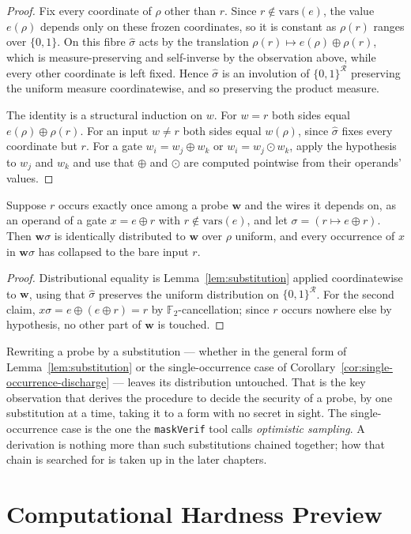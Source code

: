 \begin{proof}
Fix every coordinate of $\rho$ other than $r$. Since $r \notin \mathrm{vars}(e)$,
the value $e(\rho)$ depends only on these frozen coordinates, so it is constant
as $\rho(r)$ ranges over $\{0,1\}$. On this fibre $\widehat{\sigma}$ acts by the
translation $\rho(r) \mapsto e(\rho) \oplus \rho(r)$, which is measure-preserving
and self-inverse by the observation above, while every other coordinate is left
fixed. Hence $\widehat{\sigma}$ is an involution of $\{0,1\}^{\mathcal{R}}$
preserving the uniform measure coordinatewise, and so preserving the product
measure.

The identity is a structural induction on $w$. For $w = r$ both sides equal
$e(\rho) \oplus \rho(r)$. For an input $w \neq r$ both sides equal $w(\rho)$,
since $\widehat{\sigma}$ fixes every coordinate but $r$. For a gate
$w_i = w_j \oplus w_k$ or $w_i = w_j \odot w_k$, apply the hypothesis to $w_j$
and $w_k$ and use that $\oplus$ and $\odot$ are computed pointwise from their
operands' values.
\end{proof}

\begin{corollary}
\label{cor:single-occurrence-discharge}
Suppose $r$ occurs exactly once among a probe $\mathbf{w}$ and the wires it
depends on, as an operand of a gate $x = e \oplus r$ with
$r \notin \mathrm{vars}(e)$, and let $\sigma = (r \mapsto e \oplus r)$. Then
$\mathbf{w}\sigma$ is identically distributed to $\mathbf{w}$ over $\rho$
uniform, and every occurrence of $x$ in $\mathbf{w}\sigma$ has collapsed to the
bare input $r$.
\end{corollary}

\begin{proof}
Distributional equality is Lemma~\ref{lem:substitution} applied coordinatewise
to $\mathbf{w}$, using that $\widehat{\sigma}$ preserves the uniform
distribution on $\{0,1\}^{\mathcal{R}}$. For the second claim,
$x\sigma = e \oplus (e \oplus r) = r$ by $\mathbb{F}_2$-cancellation; since $r$
occurs nowhere else by hypothesis, no other part of $\mathbf{w}$ is touched.
\end{proof}

\begin{remark}
Rewriting a probe by a substitution --- whether in the general form of
Lemma~\ref{lem:substitution} or the single-occurrence case of
Corollary~\ref{cor:single-occurrence-discharge} --- leaves its distribution
untouched. That is the key observation that derives the procedure
to decide the security of a probe, by one
substitution at a time, taking it to a form with no secret in sight. The
single-occurrence case is the one the \texttt{maskVerif} tool
\parencite{10.1007/978-3-030-29959-0_15} calls \emph{optimistic sampling}. A
derivation is nothing more than such substitutions chained together; how that
chain is searched for is taken up in the later chapters.
\end{remark}

\section{Computational Hardness Preview}
\label{sec:hardness-preview}
